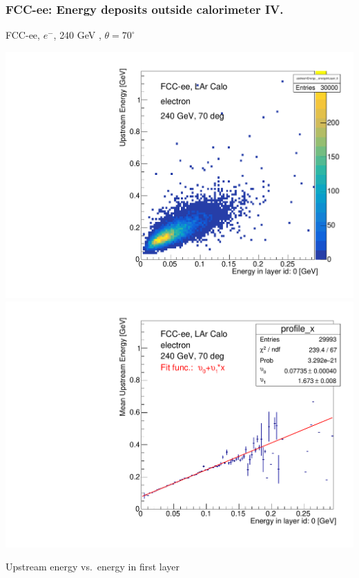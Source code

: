 \documentclass[aspectratio=169]{beamer}
\newcommand{\bluetext}[1]{%
  \textcolor{myBlue}{#1}
}
\newcommand{\redtext}[1]{%
  \textcolor{myRed}{#1}
}
\begin{document}
\begin{frame}
  \frametitle{FCC-ee: Energy deposits outside calorimeter IV.}

  \centering
  FCC-ee, $e^{-}$, \redtext{240 GeV}, \bluetext{$\theta = 70^{\circ}$} \\[1.5ex]
  \begin{adjustwidth}{-5mm}{-5mm}
    \includegraphics[width=0.49\linewidth]{figures/2d/hist_upstream_vs_layer_0_70deg_240GeV.pdf}
    \includegraphics[width=0.49\linewidth]{figures/2d/profile_upstream_vs_layer_0_70deg_240GeV.pdf}
  \end{adjustwidth}
  \redtext{Upstream} energy vs.\ energy in first layer
\end{frame}
\end{document}
